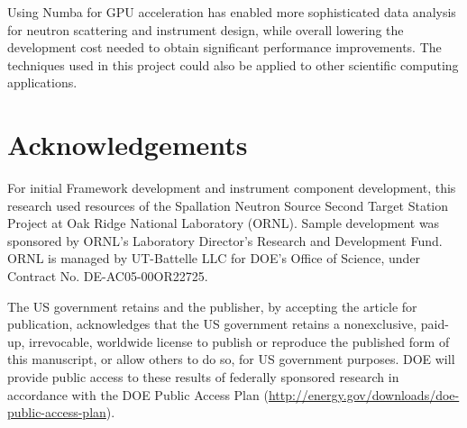 Using Numba for GPU acceleration has enabled more sophisticated data analysis for neutron scattering and instrument design, while overall lowering the development cost needed to obtain significant performance improvements. The techniques used in this project could also be applied to other scientific computing applications.


\section{Acknowledgements}
For initial Framework development and instrument component development, this research used resources of the Spallation Neutron Source Second Target Station Project at Oak Ridge National Laboratory (ORNL). Sample development was sponsored by ORNL's Laboratory Director's Research and Development Fund. ORNL is managed by UT-Battelle LLC for DOE’s Office of Science, under Contract No. DE-AC05-00OR22725.

The US government retains and the publisher, by accepting the article for publication, acknowledges that the US government retains a nonexclusive, paid-up, irrevocable, worldwide license to publish or reproduce the published form of this manuscript, or allow others to do so, for US government purposes. DOE will provide public access to these results of federally sponsored research in accordance with the DOE Public Access Plan (\url{http://energy.gov/downloads/doe-public-access-plan}).
